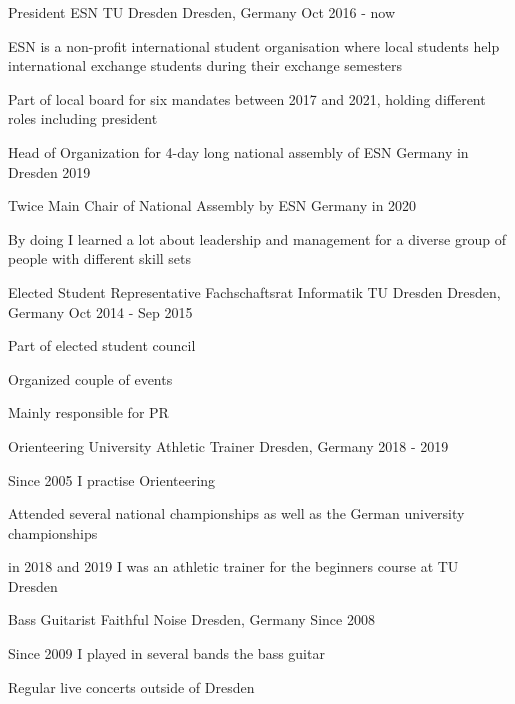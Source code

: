 \begin{cventries}

	\cventry
	{President} %
	{ESN TU Dresden} %
	{Dresden, Germany} %
	{Oct 2016 - now} %
	{
		\begin{cvitems} %
			\item{ESN is a non-profit international student organisation where local students help international exchange students during their exchange semesters}
			\item{Part of local board for six mandates between 2017 and 2021, holding different roles including president}
			\item{Head of Organization for 4-day long national assembly of ESN Germany in Dresden 2019}
			\item{Twice Main Chair of National Assembly by ESN Germany in 2020}
			\item { By doing I learned a lot about leadership and management for a diverse group of people with different skill sets}
		\end{cvitems}
	}


	\cventry
	{Elected Student Representative} %
	{Fachschaftsrat Informatik TU Dresden} %
	{Dresden, Germany} %
	{Oct 2014 - Sep 2015} %
	{
		\begin{cvitems} %
			\item{Part of elected student council}
			\item{Organized couple of events}
			\item{Mainly responsible for PR}
		\end{cvitems}
	}


	\cventry
	{Orienteering} %
	{University Athletic Trainer} %
	{Dresden, Germany} %
	{2018 - 2019} %
	{
		\begin{cvitems} %
			\item{Since 2005 I practise Orienteering}
			\item{Attended several national championships as well as the German university championships}
			\item{in 2018 and 2019 I was an athletic trainer for the beginners course at TU Dresden}
		\end{cvitems}
	}

	\cventry
	{Bass Guitarist} %
	{Faithful Noise} %
	{Dresden, Germany} %
	{Since 2008} %
	{
		\begin{cvitems} %
			\item{Since 2009 I played in several bands the bass guitar}
			\item{Regular live concerts outside of Dresden}
		\end{cvitems}
	}

\end{cventries}
